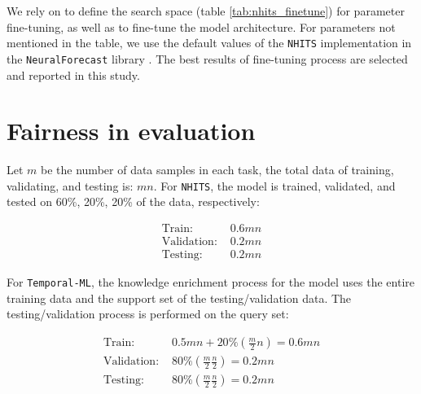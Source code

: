We rely on \cite{challu2023nhits} to define the search space (table \ref{tab:nhits_finetune}) for parameter fine-tuning, as well as to fine-tune the model architecture. For parameters not mentioned in the table, we use the default values of the \verb|NHITS| implementation in the \verb|NeuralForecast| library \cite{neuralforecast}. The best results of fine-tuning process are selected and reported in this study.

\section{Fairness in evaluation}


Let $m$ be the number of data samples in each task, the total data of training, validating, and testing is: $mn$. For \verb|NHITS|, the model is trained, validated, and tested on 60\%, 20\%, 20\% of the data, respectively:

\begin{align*}
    \text{Train: } &0.6mn\\
    \text{Validation: } &0.2mn\\
    \text{Testing: } &0.2mn
\end{align*}


For \verb|Temporal-ML|, the knowledge enrichment process for the model uses the entire training data and the support set of the testing/validation data. The testing/validation process is performed on the query set:

\begin{align*}
    \text{Train: } &0.5mn + 20\%\left( \frac{m}{2}n \right) = 0.6mn\\
    \text{Validation: } &80\% \left( \frac{m}{2}\frac{n}{2} \right)  =0.2mn\\
    \text{Testing: } &80\% \left( \frac{m}{2}\frac{n}{2} \right) =0.2mn
\end{align*}



